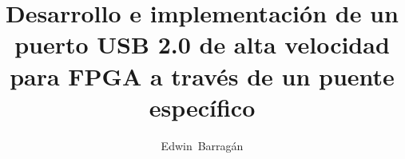 \documentclass[12pt,a4paper,twosides,openright]{report}
\title{Desarrollo e implementación de un puerto USB 2.0 de alta velocidad para
	FPGA a través de un puente específico}
\author{Edwin~Barragán}
\begin{document}
	
		\renewcommand{\tablename}{Tabla}

		

		

		\tableofcontents

		
\end{document}
